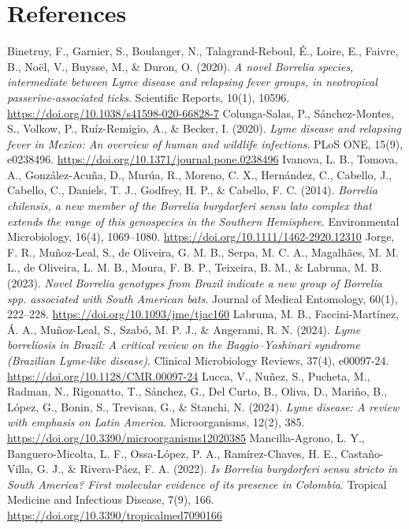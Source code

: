 \documentclass[11pt,letterpaper]{article}
\begin{document}
\newpage
\singlespacing
\section*{References}


\begin{thebibliography}
 Binetruy, F., Garnier, S., Boulanger, N., Talagrand-Reboul, É., Loire, E., Faivre, B., Noël, V., Buysse, M., \& Duron, O. (2020). \textit{A novel Borrelia species, intermediate between Lyme disease and relapsing fever groups, in neotropical passerine-associated ticks}. Scientific Reports, 10(1), 10596. \url{https://doi.org/10.1038/s41598-020-66828-7}
 Colunga-Salas, P., Sánchez-Montes, S., Volkow, P., Ruíz-Remigio, A., \& Becker, I. (2020). \textit{Lyme disease and relapsing fever in Mexico: An overview of human and wildlife infections}. PLoS ONE, 15(9), e0238496. \url{https://doi.org/10.1371/journal.pone.0238496}
 Ivanova, L. B., Tomova, A., González-Acuña, D., Murúa, R., Moreno, C. X., Hernández, C., Cabello, J., Cabello, C., Daniels, T. J., Godfrey, H. P., \& Cabello, F. C. (2014). \textit{Borrelia chilensis, a new member of the Borrelia burgdorferi sensu lato complex that extends the range of this genospecies in the Southern Hemisphere}. Environmental Microbiology, 16(4), 1069–1080. \url{https://doi.org/10.1111/1462-2920.12310}
 Jorge, F. R., Muñoz-Leal, S., de Oliveira, G. M. B., Serpa, M. C. A., Magalhães, M. M. L., de Oliveira, L. M. B., Moura, F. B. P., Teixeira, B. M., \& Labruna, M. B. (2023). \textit{Novel Borrelia genotypes from Brazil indicate a new group of Borrelia spp. associated with South American bats}. Journal of Medical Entomology, 60(1), 222–228. \url{https://doi.org/10.1093/jme/tjac160}
 Labruna, M. B., Faccini-Martínez, Á. A., Muñoz-Leal, S., Szabó, M. P. J., \& Angerami, R. N. (2024). \textit{Lyme borreliosis in Brazil: A critical review on the Baggio–Yoshinari syndrome (Brazilian Lyme-like disease)}. Clinical Microbiology Reviews, 37(4), e00097-24. \url{https://doi.org/10.1128/CMR.00097-24}
 Lucca, V., Nuñez, S., Pucheta, M., Radman, N., Rigonatto, T., Sánchez, G., Del Curto, B., Oliva, D., Mariño, B., López, G., Bonin, S., Trevisan, G., \& Stanchi, N. (2024). \textit{Lyme disease: A review with emphasis on Latin America}. Microorganisms, 12(2), 385. \url{https://doi.org/10.3390/microorganisms12020385}
 Mancilla-Agrono, L. Y., Banguero-Micolta, L. F., Ossa-López, P. A., Ramírez-Chaves, H. E., Castaño-Villa, G. J., \& Rivera-Páez, F. A. (2022). \textit{Is Borrelia burgdorferi sensu stricto in South America? First molecular evidence of its presence in Colombia}. Tropical Medicine and Infectious Disease, 7(9), 166. \url{https://doi.org/10.3390/tropicalmed7090166}

\end{thebibliography}
\end{document}
